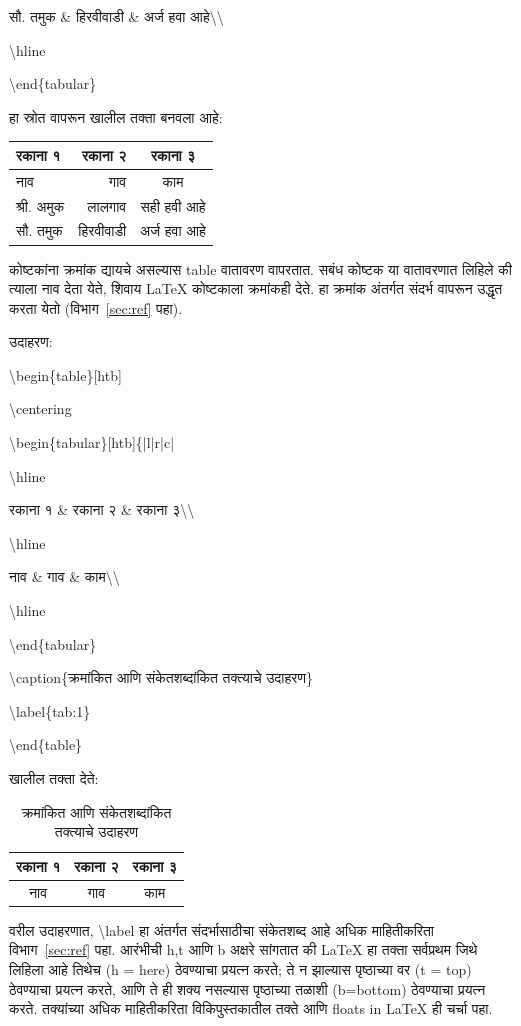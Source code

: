 \documentclass[11pt]{article}
\newcommand{\7}{\textbackslash}
\newcommand{\Syn}{\textenglish}
\begin{document}
 सौ. तमुक {\Syn\&} हिरवीवाडी {\Syn\&} अर्ज हवा आहे\7\7

 \Syn{\7hline}
 
\Syn{\7end\{tabular\}}

\medskip
 
हा स्रोत वापरून खालील तक्ता बनवला आहे:
 \medskip
 
 \begin{tabular}[htb]{|l|r|c|}
\hline
रकाना १ & रकाना २ & रकाना ३\\
\hline
नाव & गाव & काम\\
\hline
 श्री. अमुक & लालगाव & सही हवी आहे\\
 सौ. तमुक & हिरवीवाडी & अर्ज हवा आहे\\
\hline
 \end{tabular}
 \medskip

 \dotfill
 \medskip

 कोष्टकांना क्रमांक द्यायचे असल्यास \Syn{table} वातावरण\index{\Syn{table} वातावरण} वापरतात. सबंध कोष्टक या वातावरणात
 लिहिले की त्याला नाव देता येते, शिवाय {\LaTeX} कोष्टकाला क्रमांकही देते. हा क्रमांक
 अंतर्गत संदर्भ वापरून उद्धृत करता येतो (विभाग~\ref{sec:ref} पहा).
 \medskip

 उदाहरण:
 \medskip
 
\Syn{\7begin\{table\}[htb]}

\Syn{ \7centering}

 \Syn{\7begin\{tabular\}[htb]\{|l|r|c|}
 
\Syn{\7hline}

 रकाना १ {\Syn\&} रकाना २ {\Syn\&} रकाना ३\7\7

 \Syn{\7hline}

 नाव {\Syn\&} गाव {\Syn\&} काम\7\7
 
 \Syn{\7hline}

 \Syn{\7end\{tabular\}}

 \Syn{\7caption}\{क्रमांकित आणि संकेतशब्दांकित तक्त्याचे उदाहरण\}

 \Syn{ \7label\{tab:1\}}

 \Syn{\7end\{table\}}

 खालील तक्ता देते:

 \begin{table}[htb]
 \centering
 \begin{tabular}[htb]{|c|c|c|}
\hline
रकाना १ & रकाना २ & रकाना ३\\
\hline
नाव & गाव & काम\\
\hline
 \end{tabular}
 \label{tab:1}
 \caption{क्रमांकित आणि संकेतशब्दांकित तक्त्याचे उदाहरण}
 \end{table}
 वरील उदाहरणात, \Syn{\7label} हा अंतर्गत संदर्भासाठीचा संकेतशब्द आहे अधिक
 माहितीकरिता विभाग~\ref{sec:ref} पहा. आरंभीची \Syn{h,t} आणि \Syn{b} अक्षरे
 सांगतात की {\LaTeX} हा तक्ता सर्वप्रथम जिथे लिहिला आहे तिथेच (\Syn{h =
 here}) ठेवण्याचा प्रयत्न करते; ते न झाल्यास पृष्ठाच्या वर (\Syn{t = top})
 ठेवण्याचा प्रयत्न करते, आणि ते ही शक्य नसल्यास पृष्ठाच्या तळाशी (\Syn{b=bottom})
 ठेवण्याचा प्रयत्न करते. तक्यांच्या अधिक माहितीकरिता विकिपुस्तकातील तक्ते आणि
 {\Bask floats in \LaTeX} ही चर्चा पहा.
 \medskip
 
\end{document}
